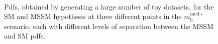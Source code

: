 \begin{figure}[h!]
\begin{center}
~\\
\end{center}
\caption{Pdfs, obtained by generating a large number of toy datasets, for the SM and MSSM hypothesis at three different points in the $m_{\text{h}}^{\text{mod+}}$
scenario, each with different levels of separation between the MSSM and SM pdfs.}
\label{fig:mssm_mssmvssm_toys}
\end{figure}

